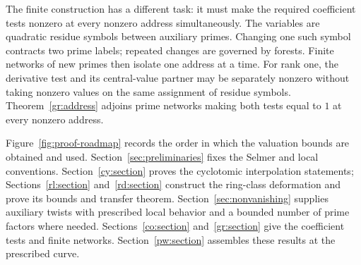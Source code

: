 The finite construction has a different task: it must make the required
coefficient tests nonzero at every nonzero address simultaneously.
The variables are quadratic residue symbols between auxiliary primes.
Changing one such symbol contracts two prime labels; repeated changes
are governed by forests.  Finite networks of new primes then isolate
one address at a time.  For rank one, the derivative test and its
central-value partner may be separately nonzero without taking nonzero
values on the same assignment of residue symbols.  Theorem~\ref{gr:address}
adjoins prime networks making both tests equal to $1$ at every nonzero
address.

Figure~\ref{fig:proof-roadmap} records the order in which the valuation
bounds are obtained and used.  Section~\ref{sec:preliminaries} fixes the
Selmer and local conventions.  Section~\ref{cy:section} proves the
cyclotomic interpolation statements; Sections~\ref{rl:section}
and~\ref{rd:section} construct the ring-class deformation and prove its
bounds and transfer theorem.  Section~\ref{sec:nonvanishing} supplies
auxiliary twists with prescribed local behavior and a bounded number of
prime factors where needed.  Sections~\ref{co:section}
and~\ref{gr:section} give the coefficient tests and finite networks.
Section~\ref{pw:section} assembles these results at the prescribed curve.


